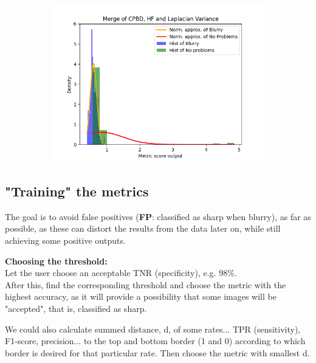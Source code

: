 \begin{figure}[H]
\begin{subfigure}[t]{0.48\textwidth}
        \caption{}
        \label{fig:CPBD_HF_LV_thresh}
    \end{subfigure}\hspace{1em}
    \begin{subfigure}[t]{0.48\textwidth}
        \includegraphics[width=\textwidth]{Figures/BlurredImages/results_on_thresholds/output_dens_cpbd_hf_lv.png}
        \caption{}
        \label{fig:CPBD_HF_LV_dens}
    \end{subfigure}\hspace{1em}
    \caption{}
    \label{fig:CPBD_HF_LV_final}
\end{figure}



\subsection{"Training" the metrics}
The goal is to avoid false positives (\textbf{FP}: classified as sharp when blurry), as far as possible, as these can distort the results from the data later on, while still achieving some positive outputs.

\textbf{Choosing the threshold:}\\
Let the user choose an acceptable TNR (specificity), e.g. 98\%.\\
After this, find the corresponding threshold and choose the metric with the highest accuracy, as it will provide a possibility that some images will be "accepted", that is, classified as sharp. 

We could also calculate summed distance, d, of some rates... TPR (sensitivity), F1-score, precision...  to the top and bottom border (1 and 0) according to which border is desired for that particular rate. Then choose the metric with smallest d.


